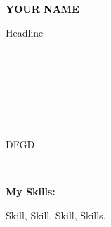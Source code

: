 \documentclass[9pt]{developercv} %
\begin{document}
    
    \begin{minipage}[t]{0.5\textwidth} 
    \vspace{-\baselineskip}
    
    \fontsize{16}{20} \textcolor{black}{\textbf{\MakeUppercase{YOUR NAME}}}
    
    \vspace{6pt}
    
    {\Large Headline}
    \end{minipage}
    \hfill
    \begin{minipage}[t]{0.2\textwidth}
      \vspace{-\baselineskip}
      
      
      \\
      \
      
    \end{minipage}
    \begin{minipage}[t]{0.27\textwidth}
      \vspace{-\baselineskip}
      
      \\
      \\
      \    
        
    \end{minipage}
    
    \begin{minipage}[t]{0.46\textwidth}
    \vspace{-6pt}

    DFGD\\
    \end{minipage}
    \hfill
    \
    \begin{minipage}[t]{0.465\textwidth}
    \vspace{-6pt}
    
    
        \begin{minipage}[t]{0.2\textwidth}
        \textbf{My Skills:}
        \end{minipage}
        \hfill
        \begin{minipage}[t]{0.73\textwidth}
          Skill, Skill, Skill, Skills.
        \end{minipage}
        
    
    
    
\end{minipage}
    
\end{document}
